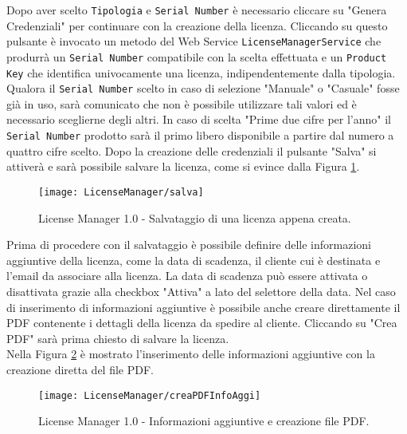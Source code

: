Dopo aver scelto \texttt{Tipologia} e \texttt{Serial Number} è necessario cliccare su "Genera Credenziali" per continuare con la creazione della licenza. Cliccando su questo pulsante è invocato un metodo del Web Service \texttt{LicenseManagerService} che produrrà un \texttt{Serial Number} compatibile con la scelta effettuata e un \texttt{Product Key} che identifica univocamente una licenza, indipendentemente dalla tipologia. Qualora il \texttt{Serial Number} scelto in caso di selezione "Manuale" o "Casuale" fosse già in uso, sarà comunicato che non è possibile utilizzare tali valori ed è necessario sceglierne degli altri. In caso di scelta "Prime due cifre per l’anno" il \texttt{Serial Number} prodotto sarà il primo libero disponibile a partire dal numero a quattro cifre scelto. Dopo la creazione delle credenziali il pulsante "Salva" si attiverà e sarà possibile salvare la licenza, come si evince dalla Figura \ref{salva}.

 \begin{figure}[!h] 
    \centering 
    \texttt{[image: LicenseManager/salva]} 
    \caption{License Manager 1.0 - Salvataggio di una licenza appena creata.}
\label{salva}
\end{figure}

Prima di procedere con il salvataggio è possibile definire delle informazioni aggiuntive della licenza, come la data di scadenza, il cliente cui è destinata e l’email da associare alla licenza. La data di scadenza può essere attivata o disattivata grazie alla checkbox "Attiva" a lato del selettore della data. Nel caso di inserimento di informazioni aggiuntive è possibile anche creare direttamente il PDF contenente i dettagli della licenza da spedire al cliente. Cliccando su "Crea PDF" sarà prima chiesto di salvare la licenza.
\\Nella Figura \ref{pdf} è mostrato l'inserimento delle informazioni aggiuntive con la creazione diretta del file PDF.


\begin{figure}[!h] 
    \centering 
    \texttt{[image: LicenseManager/creaPDFInfoAggi]} 
    \caption{License Manager 1.0 - Informazioni aggiuntive e creazione file PDF.}
\label{pdf}
\end{figure}

